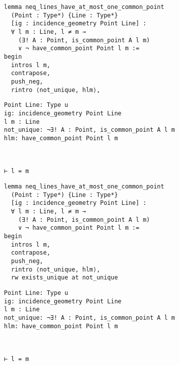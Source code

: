 \begin{frame}[fragile]
	\begin{multicols}{2}
		\begin{lstlisting}
lemma neq_lines_have_at_most_one_common_point 
  (Point : Type*) {Line : Type*} 
  [ig : incidence_geometry Point Line] :
  ∀ l m : Line, l ≠ m → 
    (∃! A : Point, is_common_point A l m) 
    ∨ ¬ have_common_point Point l m := 
begin
  intros l m,
  contrapose,
  push_neg,
  rintro ⟨not_unique, hlm⟩,
\end{lstlisting}
		\columnbreak
		\begin{lstlisting}
Point Line: Type u
ig: incidence_geometry Point Line
l m : Line
not_unique: ¬∃! A : Point, is_common_point A l m
hlm: have_common_point Point l m



⊢ l = m
		\end{lstlisting}
	\end{multicols}
\end{frame}










\begin{frame}[fragile]
	\begin{multicols}{2}
		\begin{lstlisting}
lemma neq_lines_have_at_most_one_common_point 
  (Point : Type*) {Line : Type*} 
  [ig : incidence_geometry Point Line] :
  ∀ l m : Line, l ≠ m → 
    (∃! A : Point, is_common_point A l m) 
    ∨ ¬ have_common_point Point l m := 
begin
  intros l m,
  contrapose,
  push_neg,
  rintro ⟨not_unique, hlm⟩,
  rw exists_unique at not_unique
\end{lstlisting}
		\columnbreak
		\begin{lstlisting}
Point Line: Type u
ig: incidence_geometry Point Line
l m : Line
not_unique: ¬∃! A : Point, is_common_point A l m
hlm: have_common_point Point l m



⊢ l = m
		\end{lstlisting}
	\end{multicols}
\end{frame}










